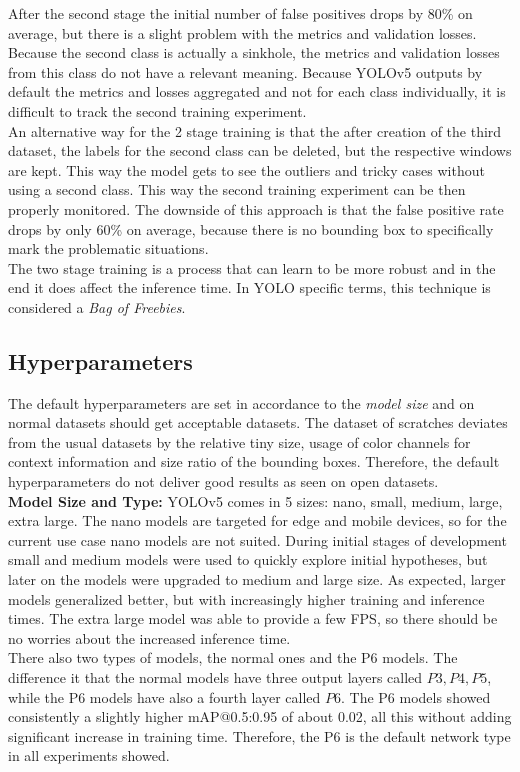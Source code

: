 After the second stage the initial number of false positives drops by 80\% on average, but there is a slight problem with the metrics and validation losses. Because the second class is actually a sinkhole, the metrics and validation losses from this class do not have a relevant meaning. Because YOLOv5 outputs by default the metrics and losses aggregated and not for each class individually, it is difficult to track the second training experiment. \\
An alternative way for the 2 stage training is that the after creation of the third dataset, the labels for the second class can be deleted, but the respective windows are kept. This way the model gets to see the outliers and tricky cases without using a second class. This way the second training experiment can be then properly monitored. The downside of this approach is that the false positive rate drops by only 60\% on average, because there is no bounding box to specifically mark the problematic situations. \\
The two stage training is a process that can learn to be more robust and in the end it does affect the inference time. In YOLO specific terms, this technique is considered a \textit{Bag of Freebies}. \\



\subsection{Hyperparameters}
The default hyperparameters are set in accordance to the \textit{model size} and on normal datasets should get acceptable datasets. The dataset of scratches deviates from the usual datasets by the relative tiny size, usage of color channels for context information and size ratio of the bounding boxes. Therefore, the default hyperparameters do not deliver good results as seen on open datasets. \\

\textbf{Model Size and Type:}
YOLOv5 comes in 5 sizes: nano, small, medium, large, extra large. The nano models are targeted for edge and mobile devices, so for the current use case nano models are not suited.
During initial stages of development small and medium models were used to quickly explore initial hypotheses, but later on the models were upgraded to medium and large size. As expected, larger models generalized better, but with increasingly higher training and inference times. The extra large model was able to provide a few FPS, so there should be no worries about the increased inference time. \\
There also two types of models, the normal ones and the P6 models. The difference it that the normal models have three output layers called $P3, P4, P5$, while the P6 models have also a fourth layer called $P6$. The P6 models showed consistently a slightly higher mAP@0.5:0.95 of about 0.02, all this without adding significant increase in training time. Therefore, the P6 is the default network type in all experiments showed.

